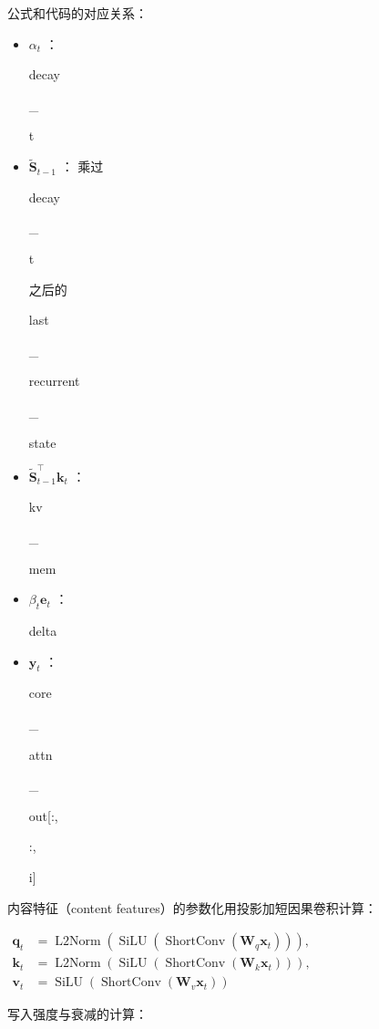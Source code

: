 \documentclass[zihao=false,fontset=windows]{ctexart}
\newcommand{\bigmath}[1]{%
  \begin{center}\large$\displaystyle #1$\end{center}%
}
\begin{document}
\begin{feishuquote}
公式和代码的对应关系：

\begin{itemize}
\item $\alpha_t$ ：{\setlength{\fboxsep}{0pt}\colorbox{inlinebg}{\strut\ttfamily decay}\colorbox{inlinebg}{\strut\ttfamily \_}\allowbreak{}\colorbox{inlinebg}{\strut\ttfamily t}}
\item $\widetilde{\mathbf S}_{t-1}$ ： 乘过 {\setlength{\fboxsep}{0pt}\colorbox{inlinebg}{\strut\ttfamily decay}\colorbox{inlinebg}{\strut\ttfamily \_}\allowbreak{}\colorbox{inlinebg}{\strut\ttfamily t}} 之后的 {\setlength{\fboxsep}{0pt}\colorbox{inlinebg}{\strut\ttfamily last}\colorbox{inlinebg}{\strut\ttfamily \_}\allowbreak{}\colorbox{inlinebg}{\strut\ttfamily recurrent}\colorbox{inlinebg}{\strut\ttfamily \_}\allowbreak{}\colorbox{inlinebg}{\strut\ttfamily state}}
\item $\widetilde{\mathbf S}_{t-1}^{\top}\mathbf k_t$ ： {\setlength{\fboxsep}{0pt}\colorbox{inlinebg}{\strut\ttfamily kv}\colorbox{inlinebg}{\strut\ttfamily \_}\allowbreak{}\colorbox{inlinebg}{\strut\ttfamily mem}}
\item $\beta_t\mathbf e_t$ ： {\setlength{\fboxsep}{0pt}\colorbox{inlinebg}{\strut\ttfamily delta}}
\item $\mathbf y_t$ ： {\setlength{\fboxsep}{0pt}\colorbox{inlinebg}{\strut\ttfamily core}\colorbox{inlinebg}{\strut\ttfamily \_}\allowbreak{}\colorbox{inlinebg}{\strut\ttfamily attn}\colorbox{inlinebg}{\strut\ttfamily \_}\allowbreak{}\colorbox{inlinebg}{\strut\ttfamily out[:,} \colorbox{inlinebg}{\strut\ttfamily :,} \colorbox{inlinebg}{\strut\ttfamily i]}}
\end{itemize}
\end{feishuquote}

\par\vspace{0.75em}\par\vspace{0.28em}
内容特征（content features）的参数化用投影加短因果卷积计算：

\bigmath{\begin{aligned}\mathbf q_t&=\operatorname{L2Norm}(\operatorname{SiLU}(\operatorname{ShortConv}(\mathbf W_q\mathbf x_t))),\\\mathbf k_t&=\operatorname{L2Norm}(\operatorname{SiLU}(\operatorname{ShortConv}(\mathbf W_k\mathbf x_t))),\\\mathbf v_t&=\operatorname{SiLU}(\operatorname{ShortConv}(\mathbf W_v\mathbf x_t))\end{aligned}}
写入强度与衰减的计算：
\end{document}
